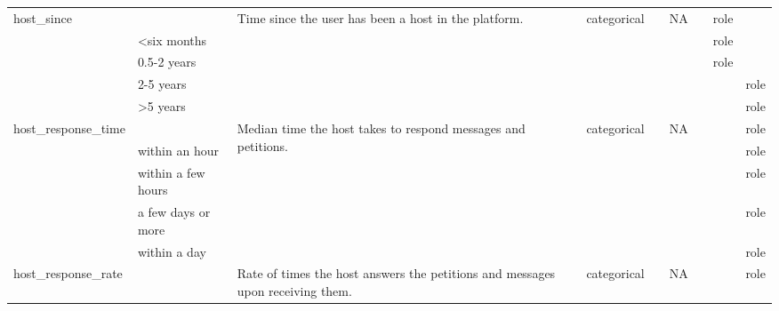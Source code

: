 \begin{center}
\begin{longtable}{@{}lllllllll@{}}
host\_since &                             & \multirow{5}{15ex}{Time since the user has been a host in the platform.} & categorical &                & NA                          &         & role \\
                            & \textless{}six months          &                                   &             &                &                             &         & role \\
                            & 0.5-2 years                  &                                   &             &                &                             &         & role \\
                            & 2-5 years                    &                                   &             &                &                             &                     &         & role \\
                            & \textgreater{}5 years        &                                   &             &                &                             &                     &         & role \\
host\_response\_time        &                             & \multirow{5}{15ex}{Median time the host takes to respond messages and petitions.} & categorical &                & NA                          &                     &         & role \\
                            & within an hour              &                                   &             &                &                             &                     &         & role \\
                            & within a few hours          &                                   &             &                &                             &                     &         & role \\
                            & a few days or more          &                                   &             &                &                             &                     &         & role \\
                            & within a day                &                                   &             &                &                             &                     &         & role \\
host\_response\_rate        &                             & \multirow{5}{15ex}{Rate of times the host answers the petitions and messages upon receiving them.} & categorical &                & NA                    &                     &         & role \\

\end{longtable}
\end{center}

